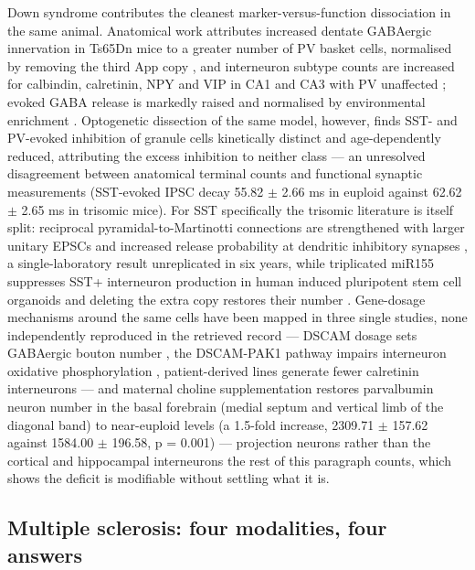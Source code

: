 \documentclass[11pt]{article}
\begin{document}
Down syndrome contributes the cleanest marker-versus-function dissociation in the same animal. Anatomical work attributes increased dentate GABAergic innervation in Ts65Dn mice to a greater number of PV basket cells, normalised by removing the third App copy \citep{Mojabi2016}, and interneuron subtype counts are increased for calbindin, calretinin, NPY and VIP in CA1 and CA3 with PV unaffected \citep{HernandezGonzalez2014}; evoked GABA release is markedly raised and normalised by environmental enrichment \citep{Begenisic2011}. Optogenetic dissection of the same model, however, finds SST- and PV-evoked inhibition of granule cells kinetically distinct and age-dependently reduced, attributing the excess inhibition to neither class \citep{Gutmann2026} --- an unresolved disagreement between anatomical terminal counts and functional synaptic measurements (SST-evoked IPSC decay 55.82 $\pm$ 2.66 ms in euploid against 62.62 $\pm$ 2.65 ms in trisomic mice). For SST specifically the trisomic literature is itself split: reciprocal pyramidal-to-Martinotti connections are strengthened with larger unitary EPSCs and increased release probability at dendritic inhibitory synapses \citep{ZorrillaDeSanMartin2020}, a single-laboratory result unreplicated in six years, while triplicated miR155 suppresses SST+ interneuron production in human induced pluripotent stem cell organoids and deleting the extra copy restores their number \citep{Zhu2026}. Gene-dosage mechanisms around the same cells have been mapped in three single studies, none independently reproduced in the retrieved record --- DSCAM dosage sets GABAergic bouton number \citep{Liu2023}, the DSCAM-PAK1 pathway impairs interneuron oxidative phosphorylation \citep{Xu2022}, patient-derived lines generate fewer calretinin interneurons \citep{Huo2018} --- and maternal choline supplementation restores parvalbumin neuron number in the basal forebrain (medial septum and vertical limb of the diagonal band) to near-euploid levels (a 1.5-fold increase, 2309.71 $\pm$ 157.62 against 1584.00 $\pm$ 196.58, p = 0.001) \citep{Gautier2023} --- projection neurons rather than the cortical and hippocampal interneurons the rest of this paragraph counts, which shows the deficit is modifiable without settling what it is.

\subsection{Multiple sclerosis: four modalities, four answers}
\label{sec-07-multiple-sclerosis}
\end{document}
